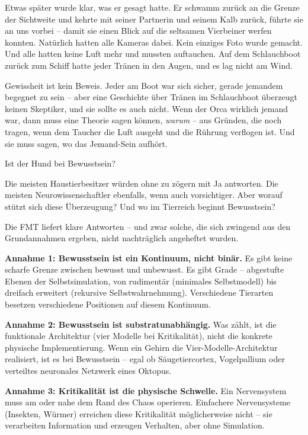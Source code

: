 \documentclass[11pt, twoside, openright]{book}
\begin{document}
Etwas später wurde klar, was er gesagt hatte. Er schwamm zurück an die Grenze der Sichtweite und kehrte mit seiner Partnerin und seinem Kalb zurück, führte sie an uns vorbei -- damit sie einen Blick auf die seltsamen Vierbeiner werfen konnten. Natürlich hatten alle Kameras dabei. Kein einziges Foto wurde gemacht. Und alle hatten keine Luft mehr und mussten auftauchen. Auf dem Schlauchboot zurück zum Schiff hatte jeder Tränen in den Augen, und es lag nicht am Wind.

Gewissheit ist kein Beweis. Jeder am Boot war sich sicher, gerade jemandem begegnet zu sein -- aber eine Geschichte über Tränen im Schlauchboot überzeugt keinen Skeptiker, und sie sollte es auch nicht. Wenn der Orca wirklich jemand war, dann muss eine Theorie sagen können, \textit{warum} -- aus Gründen, die noch tragen, wenn dem Taucher die Luft ausgeht und die Rührung verflogen ist. Und sie muss sagen, wo das Jemand-Sein aufhört.

Ist der Hund bei Bewusstsein?

Die meisten Haustierbesitzer würden ohne zu zögern mit Ja antworten. Die meisten Neurowissenschaftler ebenfalls, wenn auch vorsichtiger. Aber worauf stützt sich diese Überzeugung? Und wo im Tierreich beginnt Bewusstsein?

Die FMT liefert klare Antworten -- und zwar solche, die sich zwingend aus den Grundannahmen ergeben, nicht nachträglich angeheftet wurden.

\textbf{Annahme 1: Bewusstsein ist ein Kontinuum, nicht binär.} Es gibt keine scharfe Grenze zwischen bewusst und unbewusst. Es gibt Grade -- abgestufte Ebenen der Selbstsimulation, von rudimentär (minimales Selbstmodell) bis dreifach erweitert (rekursive Selbstwahrnehmung). Verschiedene Tierarten besetzen verschiedene Positionen auf diesem Kontinuum.

\textbf{Annahme 2: Bewusstsein ist substratunabhängig.} Was zählt, ist die funktionale Architektur (vier Modelle bei Kritikalität), nicht die konkrete physische Implementierung. Wenn ein Gehirn die Vier-Modelle-Architektur realisiert, ist es bei Bewusstsein -- egal ob Säugetiercortex, Vogelpallium oder verteiltes neuronales Netzwerk eines Oktopus.

\textbf{Annahme 3: Kritikalität ist die physische Schwelle.} Ein Nervensystem muss am oder nahe dem Rand des Chaos operieren. Einfachere Nervensysteme (Insekten, Würmer) erreichen diese Kritikalität möglicherweise nicht -- sie verarbeiten Information und erzeugen Verhalten, aber ohne Simulation.
\end{document}

